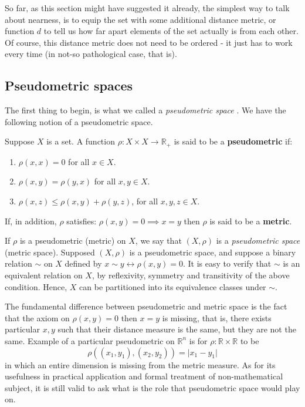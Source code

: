So far, as this section might have suggested it already, the simplest way to talk about nearness, is to equip the set with some additional distance metric, or function $d$ to tell us how far apart elements of the set actually is from each other. Of course, this distance metric does not need to be ordered - it just has to work every time (in not-so pathological case, that is).

\subsection{Pseudometric spaces}

The first thing to begin, is what we called a \textit{pseudometric space} . We have the following notion of a pseudometric space.

\begin{definition}
    Suppose $X$ is a set. A function $\rho:X\times X\to \mathbb{R}_{+}$ is said to be a \textbf{pseudometric} if: 
    \begin{enumerate}
        \item $\rho(x,x)=0$ for all $x\in X$.
        \item $\rho(x,y)=\rho(y,x)$ for all $x,y\in X$. 
        \item $\rho(x,z)\leq \rho(x,y)+\rho(y,z)$, for all $x,y,z\in X$. 
    \end{enumerate}
    If, in addition, $\rho$ satisfies: $\rho(x,y)=0\implies x=y$ then $\rho$ is said to be a \textbf{metric}. 
\end{definition}

If $\rho$ is a pseudometric (metric) on $X$, we say that $(X,\rho)$ is a \textit{pseudometric space} (metric space). Supposed $(X,\rho)$ is a pseudometric space, and suppose a binary relation $\sim$ on $X$ defined by $x\sim y \leftrightarrow \rho(x,y)=0$. It is easy to verify that $\sim$ is an equivalent relation on $X$, by reflexivity, symmetry and transitivity of the above condition. Hence, $X$ can be partitioned into its equivalence classes under $\sim$. 

The fundamental difference between pseudometric and metric space is the fact that the axiom on $\rho(x,y) = 0$ then $x=y$ is missing, that is, there exists particular $x,y$ such that their distance measure is the same, but they are not the same. Example of a particular pseudometric on $\mathbb{R}^{n}$ is for $\rho: \mathbb{R}\times \mathbb{R}$ to be \begin{equation*}
    \rho((x_1, y_1), (x_2, y_2)) = \lvert x_{1} - y_{1} \rvert
\end{equation*}  
in which an entire dimension is missing from the metric measure. As for its usefulness in practical application and formal treatment of non-mathematical subject, it is still valid to ask what is the role that pseudometric space would play on. 

